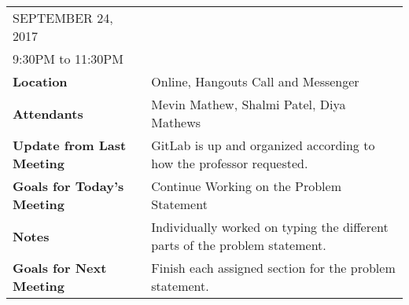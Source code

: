 \documentclass{article}
\begin{document}
\begin{table}[hp]
\begin{tabularx}{\textwidth}{lX}
\toprule
SEPTEMBER 24, 2017\\
9:30PM to 11:30PM\\
\midrule
\textbf{Location} & Online, Hangouts Call and Messenger\\
\textbf{Attendants} & Mevin Mathew, Shalmi Patel, Diya Mathews\\
\midrule
\textbf{Update from Last Meeting} & GitLab is up and organized according to how the professor requested.\\
\midrule
\textbf{Goals for Today's Meeting} & Continue Working on the Problem Statement\\
\midrule
\textbf{Notes} & Individually worked on typing the different parts of the problem statement.\\
\midrule
\textbf{Goals for Next Meeting} & Finish each assigned section for the problem statement.\\
\bottomrule
\end{tabularx}
\end{table}
\end{document}
